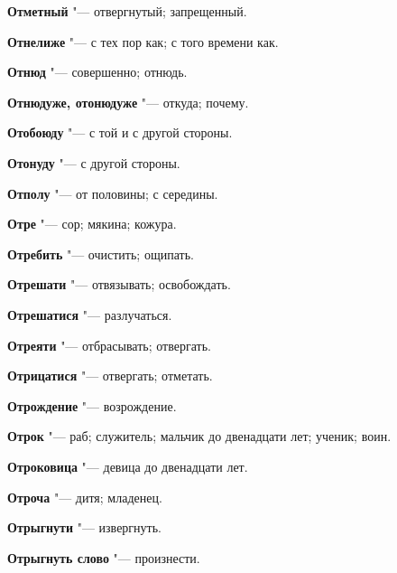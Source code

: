 \begin{mymulticols}{2}
\noindent\textbf{Отметный} "--- отвергнутый; запрещенный. 




\noindent\textbf{Отнелиже} "--- с тех пор как; с того времени как. 




\noindent\textbf{Отнюд} "--- совершенно; отнюдь. 




\noindent\textbf{Отнюдуже, отонюдуже} "--- откуда; почему. 




\noindent\textbf{Отобоюду} "--- с той и с другой стороны. 




\noindent\textbf{Отонуду} "--- с другой стороны. 




\noindent\textbf{Отполу} "--- от половины; с середины. 




\noindent\textbf{Отре} "--- сор; мякина; кожура. 




\noindent\textbf{Отребить} "--- очистить; ощипать. 




\noindent\textbf{Отрешати} "--- отвязывать; освобождать. 




\noindent\textbf{Отрешатися} "--- разлучаться. 




\noindent\textbf{Отреяти} "--- отбрасывать; отвергать. 




\noindent\textbf{Отрицатися} "--- отвергать; отметать. 




\noindent\textbf{Отрождение} "--- возрождение. 




\noindent\textbf{Отрок} "--- раб; служитель; мальчик до двенадцати лет; ученик; воин. 




\noindent\textbf{Отроковица} "--- девица до двенадцати лет. 




\noindent\textbf{Отроча} "--- дитя; младенец. 




\noindent\textbf{Отрыгнути} "--- извергнуть. 




\noindent\textbf{Отрыгнуть слово} "--- произнести. 





\end{mymulticols}
